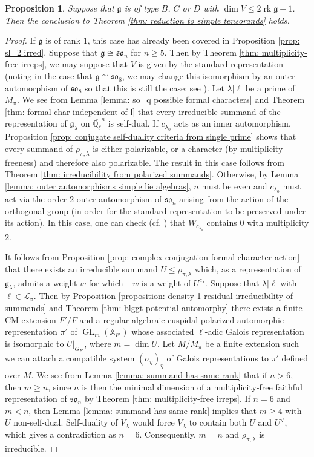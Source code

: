 \documentclass{amsart}
\newtheorem{proposition}[theorem]{Proposition}
\theoremstyle{definition}
\numberwithin{equation}{section} %
\newcommand{\GL}{\operatorname{GL}}
\newcommand{\solie}{\mathfrak{so}}
\newcommand{\rk}{\operatorname{rk}}
\newcommand{\Qlbar}{\ensuremath{\overline{\mathbb{Q}_\ell}}}
\newcommand{\bb}[1]{\mathbb{#1}}
\newcommand{\mf}[1]{\mathfrak{#1}}
\begin{document}
\begin{proposition}\label{prop: types B, C, D irred}
Suppose that $\mf{g}$ is of type $B$, $C$ or $D$ with $\dim V \leq 2 \rk \mf{g} + 1$.
Then the conclusion to Theorem \ref{thm: reduction to simple tensorands} holds.
\end{proposition}
\begin{proof}
If $\mf{g}$ is of rank $1$, this case has already been covered in Proposition \ref{prop: sl_2 irred}.
Suppose that $\mf{g} \cong \solie_{n}$ for $n \geq 5$.
Then by Theorem \ref{thm: multiplicity-free irreps}, we may suppose that $V$ is given by the standard representation (noting in the case that $\mf{g} \cong \solie_8$, we may change this isomorphism by an outer automorphism of $\solie_8$ so that this is still the case; see \cite[20.3]{fulton2013representation}).
Let $\lambda|\ell$ be a prime of $M_\pi$.
We see from Lemma \ref{lemma: so_q possible formal characters} and Theorem \ref{thm: formal char independent of l} that every irreducible summand of the representation of $\mf{g}_\lambda$ on $\Qlbar^n$ is self-dual.
If $c_{\lambda_0}$ acts as an inner automorphism, Proposition \ref{prop: conjugate self-duality criteria from single prime} shows that every summand of $\rho_{\pi,\lambda}$ is either polarizable, or a character (by multiplicity-freeness) and therefore also polarizable.
The result in this case follows from Theorem \ref{thm: irreducibility from polarized summands}.
Otherwise, by Lemma \ref{lemma: outer automorphisms simple lie algebras}, $n$ must be even and $c_{\lambda_0}$ must act via the order $2$ outer automorphism of $\solie_n$ arising from the action of the orthogonal group (in order for the standard representation to be preserved under its action). 
In this case, one can check (cf. \cite[Exercise 19.9]{fulton2013representation}) that $W_{c_{\lambda_0}}$ contains $0$ with multiplicity $2$.

It follows from Proposition \ref{prop: complex conjugation formal character action} that there exists an irreducible summand $U \leq \rho_{\pi,\lambda}$ which, as a representation of $\mf{g}_\lambda$, admits a weight $w$ for which $-w$ is a weight of $U^{c_\lambda}$.
Suppose that $\lambda|\ell$ with $\ell \in \mathcal{L}_\pi$.
Then by Proposition \ref{proposition: density 1 residual irreducibility of summands} and Theorem \ref{thm: blggt potential automorphy} there exists a finite CM extension $F'/F$ and a regular algebraic cuspidal polarized automorphic representation $\pi'$ of $\GL_m(\bb{A}_{F'})$ whose associated $\ell$-adic Galois representation is isomorphic to $U|_{G_{F'}}$, where $m = \dim U$.
Let $M/M_\pi$ be a finite extension such we can attach a compatible system $(\sigma_\eta)_\eta$ of Galois representations to $\pi'$ defined over $M$.
We see from Lemma \ref{lemma: summand has same rank} that if $n >6$, then $m \geq n$, since $n$ is then the minimal dimension of a multiplicity-free faithful representation of $\solie_n$ by Theorem \ref{thm: multiplicity-free irreps}.
If $n=6$ and $m < n$, then Lemma \ref{lemma: summand has same rank} implies that $m \geq 4$ with $U$ non-self-dual.
Self-duality of $V_{\lambda}$ would force $V_\lambda$ to contain both $U$ and $U^\vee$, which gives a contradiction as $n=6$.
Consequently, $m=n$ and $\rho_{\pi,\lambda}$ is irreducible.


\end{proof}
\end{document}
